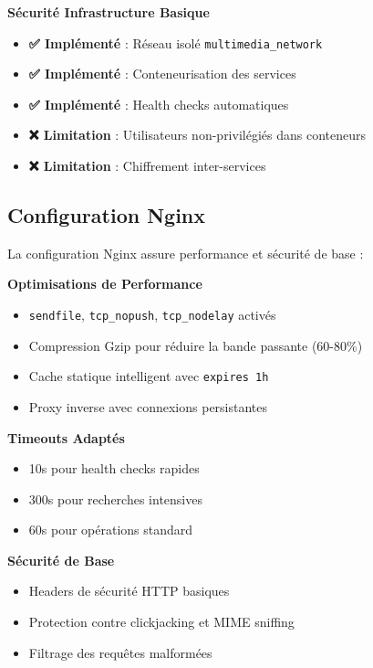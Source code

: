 \documentclass[12pt,a4paper]{article}
\begin{document}
\begin{partialbox}
\textbf{Sécurité Infrastructure Basique}
\begin{itemize}
  \item \textbf{✅ Implémenté} : Réseau isolé \texttt{multimedia\_network}
  \item \textbf{✅ Implémenté} : Conteneurisation des services
  \item \textbf{✅ Implémenté} : Health checks automatiques
  \item \textbf{❌ Limitation} : Utilisateurs non-privilégiés dans conteneurs
  \item \textbf{❌ Limitation} : Chiffrement inter-services
\end{itemize}
\end{partialbox}

\subsection{Configuration Nginx}

\begin{implementedbox}
La configuration Nginx assure performance et sécurité de base :

\textbf{Optimisations de Performance}
\begin{itemize}[leftmargin=2em]
  \item \texttt{sendfile}, \texttt{tcp\_nopush}, \texttt{tcp\_nodelay} activés
  \item Compression Gzip pour réduire la bande passante (60-80\%)
  \item Cache statique intelligent avec \texttt{expires 1h}
  \item Proxy inverse avec connexions persistantes
\end{itemize}

\textbf{Timeouts Adaptés}
\begin{itemize}[leftmargin=2em]
  \item 10s pour health checks rapides
  \item 300s pour recherches intensives
  \item 60s pour opérations standard
\end{itemize}

\textbf{Sécurité de Base}
\begin{itemize}[leftmargin=2em]
  \item Headers de sécurité HTTP basiques
  \item Protection contre clickjacking et MIME sniffing
  \item Filtrage des requêtes malformées
\end{itemize}
\end{implementedbox}
\end{document}
